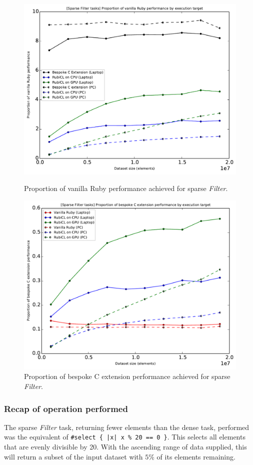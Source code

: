 \begin{figure}[H]
  \centering
  \includegraphics[width=\textwidth]{./graphing/sparse_filter/prop_van.pdf}
  \caption{Proportion of vanilla Ruby performance achieved for sparse \emph{Filter}.}
  \label{fig:sfilter_task_vperf_g}

  \includegraphics[width=\textwidth]{./graphing/sparse_filter/prop_bes.pdf}
  \caption{Proportion of bespoke C extension performance achieved for sparse \emph{Filter}.}
  \label{fig:sfilter_task_bperf_g}
\end{figure}
\subsubsection{Recap of operation performed}
The sparse \emph{Filter} task, returning fewer elements than the dense task, performed was the equivalent of \verb!#select { |x| x % 20 == 0 }!. This selects all elements that are evenly divisible by 20. With the ascending range of data supplied, this will return a subset of the input dataset with $5\%$ of its elements remaining.

